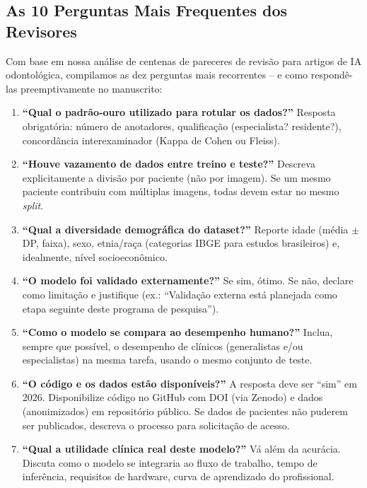 \subsection{As 10 Perguntas Mais Frequentes dos Revisores}

Com base em nossa análise de centenas de pareceres de revisão para artigos de IA
odontológica, compilamos as dez perguntas mais recorrentes -- e como respondê-las
preemptivamente no manuscrito:

\begin{enumerate}
  \item \textbf{``Qual o padrão-ouro utilizado para rotular os dados?''}
    Resposta obrigatória: número de anotadores, qualificação (especialista?
    residente?), concordância interexaminador (Kappa de Cohen ou Fleiss).

  \item \textbf{``Houve vazamento de dados entre treino e teste?''}
    Descreva explicitamente a divisão por paciente (não por imagem). Se um mesmo
    paciente contribuiu com múltiplas imagens, todas devem estar no mesmo
    \textit{split}.

  \item \textbf{``Qual a diversidade demográfica do dataset?''}
    Reporte idade (média $\pm$ DP, faixa), sexo, etnia/raça (categorias IBGE
    para estudos brasileiros) e, idealmente, nível socioeconômico.

  \item \textbf{``O modelo foi validado externamente?''}
    Se sim, ótimo. Se não, declare como limitação e justifique (ex.: ``Validação
    externa está planejada como etapa seguinte deste programa de pesquisa'').

  \item \textbf{``Como o modelo se compara ao desempenho humano?''}
    Inclua, sempre que possível, o desempenho de clínicos (generalistas e/ou
    especialistas) na mesma tarefa, usando o mesmo conjunto de teste.

  \item \textbf{``O código e os dados estão disponíveis?''}
    A resposta deve ser ``sim'' em 2026. Disponibilize código no GitHub com DOI
    (via Zenodo) e dados (anonimizados) em repositório público. Se dados de
    pacientes não puderem ser publicados, descreva o processo para solicitação
    de acesso.

  \item \textbf{``Qual a utilidade clínica real deste modelo?''}
    Vá além da acurácia. Discuta como o modelo se integraria ao fluxo de
    trabalho, tempo de inferência, requisitos de hardware, curva de aprendizado
    do profissional.


\end{enumerate}
